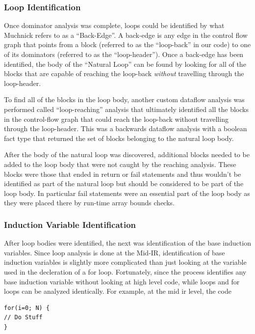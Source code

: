 \documentclass[11pt]{article}
\begin{document}
\subsubsection {Loop Identification}

Once dominator analysis was complete, loops could be identified by
what Muchnick refers to as a ``Back-Edge''. A back-edge is any edge in
the control flow graph that points from a block (referred to as the
``loop-back'' in our code) to one of its dominators (referred to as
the ``loop-header''). Once a back-edge has been identified, the body
of the ``Natural Loop'' can be found by looking for all of the blocks
that are capable of reaching the loop-back \emph{without} travelling
through the loop-header.  

To find all of the blocks in the loop body, another custom dataflow
analysis was performed called ``loop-reaching'' analysis that
ultimately identified all the blocks in the control-flow graph that
could reach the loop-back without travelling through the
loop-header. This was a backwards dataflow analysis with a boolean
fact type that returned the set of blocks belonging to the natural
loop body. 

After the body of the natural loop was discovered, additional blocks
needed to be added to the loop body that were not caught by the
reaching analysis. These blocks were those that ended in return or
fail statements and thus wouldn't be identified as part of the natural
loop but should be considered to be part of the loop body. In
particular fail statements were an essential part of the loop body as
they were placed there by run-time array bounds checks. 

\subsubsection {Induction Variable Identification} 

After loop bodies were identified, the next was identification of the
base induction variables. Since loop analysis is done at the Mid-IR,
identification of base induction variables is slightly more
complicated than just looking at the variable used in the decleration
of a for loop. Fortunately, since the process identifies any base
induction variable without looking at high level code, while loops and
for loops can be analyzed identically. For example, at the mid ir
level, the code 

\begin{verbatim} 
for(i=0; N) { 
// Do Stuff
}
\end{verbatim}
\end{document}

